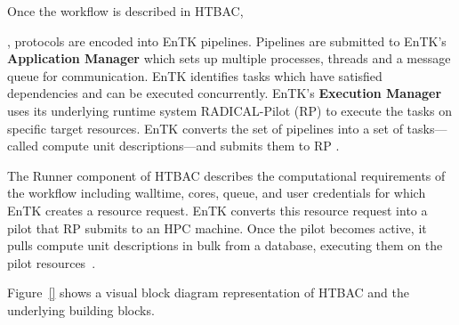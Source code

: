Once the workflow is described in HTBAC, 

, protocols are encoded into EnTK pipelines. 
Pipelines are submitted to EnTK's \textbf{Application Manager} which sets up 
multiple processes, threads and a message queue for communication. EnTK 
identifies tasks which have satisfied dependencies and can be executed 
concurrently. EnTK's \textbf{Execution Manager} uses its underlying runtime 
system RADICAL-Pilot (RP) to execute the tasks on specific target resources. 
EnTK converts the set of pipelines into a set of tasks---called compute unit 
descriptions---and submits them to RP .

The Runner component of HTBAC describes the computational requirements of the 
workflow including walltime, cores, queue, and user credentials 
 for which EnTK creates a resource request. 
EnTK converts this resource request into a pilot that RP submits to an HPC 
machine. Once the pilot becomes active, it pulls compute unit descriptions in 
bulk from a database, executing them on the pilot 
resources~\cite{merzky2015radical}. 

Figure~\ref{} shows a visual block diagram representation
 of HTBAC and the underlying building
blocks.




